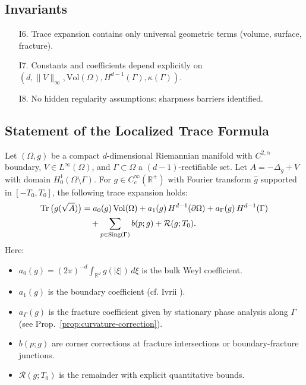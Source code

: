\subsection*{Invariants}

\begin{itemize}
  \item[I6.] Trace expansion contains only universal geometric terms (volume, surface, fracture). 
  \item[I7.] Constants and coefficients depend explicitly on $(d,\|V\|_\infty, \mathrm{Vol}(\Omega), H^{d-1}(\Gamma), \kappa(\Gamma))$. 
  \item[I8.] No hidden regularity assumptions: sharpness barriers identified. 
\end{itemize}

\subsection{Statement of the Localized Trace Formula}

\begin{theorem}
\label{thm:trace-expansion}
Let $(\Omega,g)$ be a compact $d$-dimensional Riemannian manifold with $C^{2,\alpha}$ boundary, $V \in L^\infty(\Omega)$, and $\Gamma \subset \Omega$ a $(d-1)$-rectifiable set. 
Let $A = -\Delta_g + V$ with domain $H^1_0(\Omega \setminus \Gamma)$. 
For $g \in C_c^\infty(\mathbb{R}^+)$ with Fourier transform $\hat{g}$ supported in $[-T_0,T_0]$, the following trace expansion holds:
\begin{align}
\operatorname{Tr}\big(g(\sqrt{A})\big) 
&= a_0(g)\,\mathrm{Vol}(\Omega) 
+ a_1(g)\,H^{d-1}(\partial\Omega) 
+ a_\Gamma(g)\,H^{d-1}(\Gamma) \notag\\
&\quad + \sum_{p \in \mathrm{Sing}(\Gamma)} b(p;g) 
+ \mathcal{R}(g;T_0).
\end{align}
Here:
\begin{itemize}
  \item $a_0(g) = (2\pi)^{-d}\int_{\mathbb{R}^d} g(|\xi|)\, d\xi$ is the bulk Weyl coefficient. 
  \item $a_1(g)$ is the boundary coefficient (cf. Ivrii \cite{Ivrii1980}). 
  \item $a_\Gamma(g)$ is the fracture coefficient given by stationary phase analysis along $\Gamma$ (see Prop.~\ref{prop:curvature-correction}). 
  \item $b(p;g)$ are corner corrections at fracture intersections or boundary-fracture junctions. 
  \item $\mathcal{R}(g;T_0)$ is the remainder with explicit quantitative bounds. 
\end{itemize}
\end{theorem}

